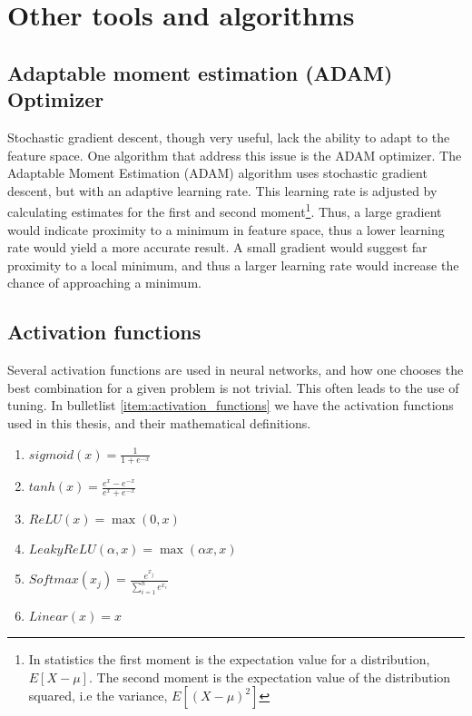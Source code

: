 \section{Other tools and algorithms}
\subsection*{Adaptable moment estimation (ADAM) Optimizer}\label{sec:adam}
Stochastic gradient descent, though very useful, lack the ability to adapt to the feature space. One algorithm that address this
issue is the ADAM optimizer\cite{ADAM:opti}. The Adaptable Moment Estimation (ADAM) algorithm uses stochastic gradient descent, but with 
an adaptive learning rate. This learning rate is adjusted by calculating estimates for the first and second moment\footnote{In statistics
the first moment is the expectation value for a distribution, $E[X-\mu]$. The second moment is the 
expectation value of the distribution squared, i.e the variance, $E[(X-\mu)^2]$}. Thus, a large gradient would indicate proximity 
to a minimum in feature space, thus a lower learning rate would yield a more accurate result. A small gradient would suggest far 
proximity to a local minimum, and thus a larger learning rate would increase the chance 
of approaching a minimum.\par 


\subsection*{Activation functions}
Several activation functions are used in neural networks, and how one chooses the best combination for a given problem is not trivial. 
This often leads to the use of tuning. In bulletlist \ref{item:activation_functions} we have the activation functions used in this thesis, 
and their mathematical definitions. 

\begin{enumerate}\label{item:activation_functions}
    \item  $sigmoid(x) = \frac{1}{1+e^{-x}}$
    \item $tanh(x) = \frac{e^x-e^{-x}}{e^x+e^{-x}}$
    \item $ReLU(x) = \max(0,x)$
    \item $LeakyReLU(\alpha, x) = \max(\alpha x,x)$
    \item $Softmax(x_j) = \frac{e^{x_j}}{\sum_{i=1}^n e^{x_i}}$
    \item $Linear(x) = x$
\end{enumerate}


